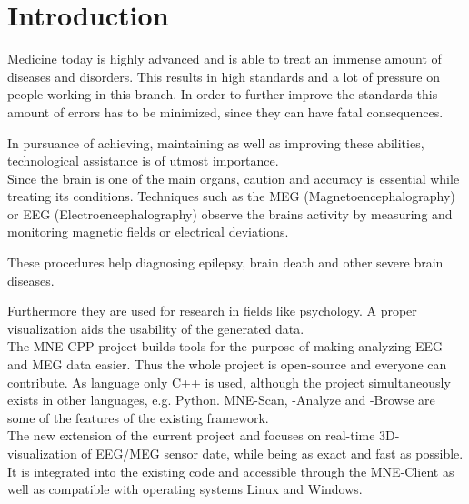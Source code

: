 
\section{Introduction}

	Medicine today is highly advanced and is able to treat an immense amount of diseases and disorders.
	This results in high standards and a lot of pressure on people working in this branch. In order to further improve the standards this amount of errors has to be 		minimized, since they can have fatal consequences.

	In pursuance of achieving, maintaining as well as improving these abilities, technological assistance is of utmost importance.\\  

	Since the brain is one of the main organs, caution and accuracy is essential while treating its conditions. 
	Techniques such as the MEG (Magnetoencephalography) or EEG (Electroencephalography) observe the brains activity by 				measuring and monitoring magnetic fields or electrical deviations.

	These procedures help diagnosing epilepsy, brain death and other severe brain diseases.

	Furthermore they are used for research in fields like psychology.
	A proper visualization aids the usability of the generated data. \\

	The MNE-CPP  project builds tools for the purpose of making analyzing EEG and MEG data easier.
	Thus the whole project is open-source and everyone can contribute. As language only C++ is used, although the project 			simultaneously exists in other languages, e.g. Python. %
	MNE-Scan, -Analyze and -Browse are some of the features of the existing framework. \\

	The new extension of the current project and focuses on real-time 3D-visualization of EEG/MEG sensor date, while being as 		exact and fast as possible. It is integrated into the existing code and accessible through the MNE-Client as well as 			compatible with operating systems Linux and Windows.
  
